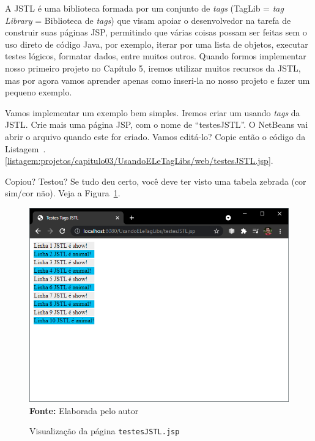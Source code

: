 A JSTL é uma biblioteca formada por um conjunto de \textit{tags} (TagLib = \textit{tag} \textit{Library} = Biblioteca de \textit{tags}) que visam apoiar o desenvolvedor na tarefa de construir suas páginas JSP, permitindo que várias coisas possam ser feitas sem o uso direto de código Java, por exemplo, iterar por uma lista de objetos, executar testes lógicos, formatar dados, entre muitos outros. Quando formos implementar nosso primeiro projeto no Capítulo 5, iremos utilizar muitos recursos da JSTL, mas por agora vamos aprender apenas como inseri-la no nosso projeto e fazer um pequeno exemplo.

Vamos implementar um exemplo bem simples. Iremos criar um  usando \textit{tags} da JSTL. Crie mais uma página JSP, com o nome de ``testesJSTL''. O NetBeans vai abrir o arquivo quando este for criado. Vamos editá-lo? Copie então o código da Listagem~\thechapter.\ref{listagem:projetos/capitulo03/UsandoELeTagLibs/web/testesJSTL.jsp}.


Copiou? Testou? Se tudo deu certo, você deve ter visto uma tabela zebrada (cor sim/cor não). Veja a Figura~\ref{fig:cap03VisualizacaoTestesJSTL}.

\FloatBarrier
\begin{figure}[!htbp]
    \centering
    \caption{Visualização da página \texttt{testesJSTL.jsp}}
    \includegraphics[scale=0.7]{imagens/cap03VisualizacaoTestesJSTL}
    \\\textbf{Fonte:} Elaborada pelo autor
    \label{fig:cap03VisualizacaoTestesJSTL}
\end{figure}
\FloatBarrier

